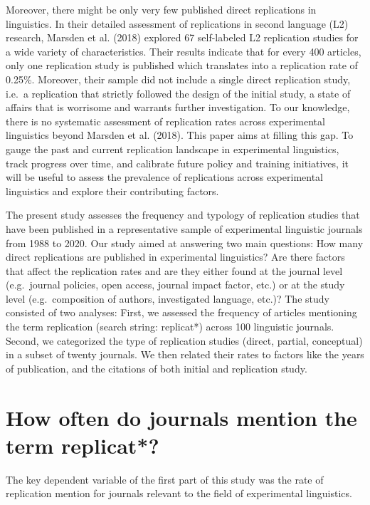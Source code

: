 \documentclass[]{elsarticle} %
\begin{document}
Moreover, there might be only very few published direct replications in linguistics. In their detailed assessment of replications in second language (L2) research, Marsden et al. (2018) explored 67 self-labeled L2 replication studies for a wide variety of characteristics. Their results indicate that for every 400 articles, only one replication study is published which translates into a replication rate of 0.25\%. Moreover, their sample did not include a single direct replication study, i.e.~a replication that strictly followed the design of the initial study, a state of affairs that is worrisome and warrants further investigation. To our knowledge, there is no systematic assessment of replication rates across experimental linguistics beyond Marsden et al. (2018). This paper aims at filling this gap. To gauge the past and current replication landscape in experimental linguistics, track progress over time, and calibrate future policy and training initiatives, it will be useful to assess the prevalence of replications across experimental linguistics and explore their contributing factors.

The present study assesses the frequency and typology of replication studies that have been published in a representative sample of experimental linguistic journals from 1988 to 2020.
Our study aimed at answering two main questions:
How many direct replications are published in experimental linguistics?
Are there factors that affect the replication rates and are they either found at the journal level (e.g.~journal policies, open access, journal impact factor, etc.) or at the study level (e.g.~composition of authors, investigated language, etc.)?
The study consisted of two analyses:
First, we assessed the frequency of articles mentioning the term replication (search string: replicat*) across 100 linguistic journals.
Second, we categorized the type of replication studies (direct, partial, conceptual) in a subset of twenty journals. We then related their rates to factors like the years of publication, and the citations of both initial and replication study.

\hypertarget{how-often-do-journals-mention-the-term-replicat}{%
\section{How often do journals mention the term replicat*?}\label{how-often-do-journals-mention-the-term-replicat}}

The key dependent variable of the first part of this study was the rate of replication mention for journals relevant to the field of experimental linguistics.
\end{document}
